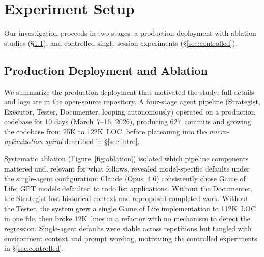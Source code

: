 \documentclass{article}
\begin{document}
\section{Experiment Setup}
\label{sec:setup}

Our investigation proceeds in two stages: a production deployment
with ablation studies (\S\ref{sec:trail}), and controlled
single-session experiments (\S\ref{sec:controlled}).

\subsection{Production Deployment and Ablation}
\label{sec:trail}

We summarize the production deployment that motivated the
study; full details and logs are in the open-source
repository. A four-stage agent pipeline (Strategist,
Executor, Tester, Documenter, looping autonomously)
operated on a production codebase for 10 days
(March~7--16, 2026), producing 627~commits and growing the
codebase from 25K to 122K~LOC, before plateauing into the
\emph{micro-optimization spiral} described in \S\ref{sec:intro}.

Systematic ablation (Figure~\ref{fig:ablation}) isolated
which pipeline components mattered and, relevant for
what follows, revealed model-specific defaults under the
single-agent configuration: Claude (Opus~4.6) consistently
chose Game of Life; GPT models defaulted to todo list
applications. Without the Documenter, the Strategist lost
historical context and reproposed completed work. Without
the Tester, the system grew a single Game of Life
implementation to 112K~LOC in one file, then broke
12K~lines in a refactor with no mechanism to detect the
regression. Single-agent defaults were stable across
repetitions but tangled with environment context and prompt
wording, motivating the controlled experiments in
\S\ref{sec:controlled}.
\end{document}
